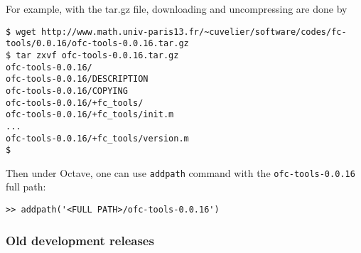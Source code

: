 For example, with the tar.gz file, downloading and uncompressing are done by 
\begin{verbatim}
$ wget http://www.math.univ-paris13.fr/~cuvelier/software/codes/fc-tools/0.0.16/ofc-tools-0.0.16.tar.gz
$ tar zxvf ofc-tools-0.0.16.tar.gz
ofc-tools-0.0.16/
ofc-tools-0.0.16/DESCRIPTION
ofc-tools-0.0.16/COPYING
ofc-tools-0.0.16/+fc_tools/
ofc-tools-0.0.16/+fc_tools/init.m
...
ofc-tools-0.0.16/+fc_tools/version.m
$
\end{verbatim}
Then under Octave, one can use \texttt{addpath} command with the \texttt{ofc-tools-0.0.16} full path:
\begin{verbatim}
>> addpath('<FULL PATH>/ofc-tools-0.0.16')
\end{verbatim}
 
 
\subsubsection{Old development releases} 
\immediate{}
